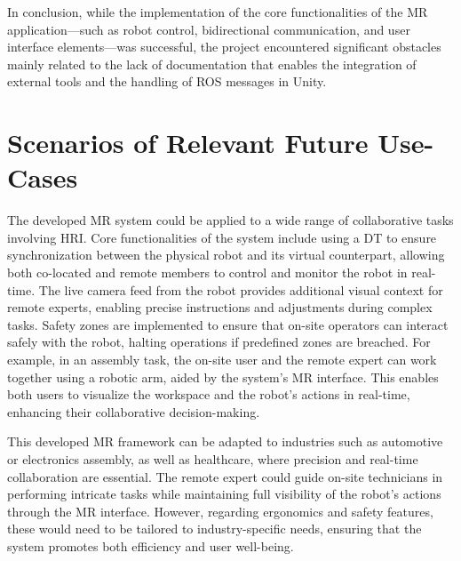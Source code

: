 In conclusion, while the implementation of the core functionalities of the \ac{MR} application—such as robot control, bidirectional communication, and user interface elements—was successful, the project encountered significant obstacles mainly related to the lack of documentation that enables the integration of external tools and the handling of \ac{ROS} messages in Unity.



\section{Scenarios of Relevant Future Use-Cases}

The developed \ac{MR} system could be applied to a wide range of collaborative tasks involving \ac{HRI}. Core functionalities of the system include using a \ac{DT} to ensure synchronization between the physical robot and its virtual counterpart, allowing both co-located and remote members to control and monitor the robot in real-time. The live camera feed from the robot provides additional visual context for remote experts, enabling precise instructions and adjustments during complex tasks. Safety zones are implemented to ensure that on-site operators can interact safely with the robot, halting operations if predefined zones are breached. For example, in an assembly task, the on-site user and the remote expert can work together using a robotic arm, aided by the system’s \ac{MR} interface. This enables both users to visualize the workspace and the robot’s actions in real-time, enhancing their collaborative decision-making. 

This developed \ac{MR} framework can be adapted to industries such as automotive or electronics assembly, as well as healthcare, where precision and real-time collaboration are essential. The remote expert could guide on-site technicians in performing intricate tasks while maintaining full visibility of the robot’s actions through the \ac{MR} interface. However, regarding ergonomics and safety features, these would need to be tailored to industry-specific needs, ensuring that the system promotes both efficiency and user well-being.

